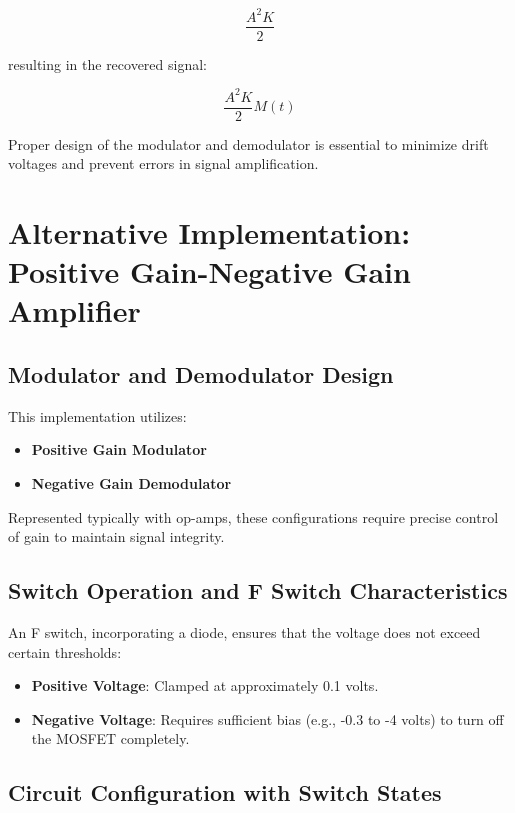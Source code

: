 \[
\frac{A^2 K}{2}
\]

resulting in the recovered signal:

\[
\frac{A^2 K}{2} M(t)
\]

Proper design of the modulator and demodulator is essential to minimize drift voltages and prevent errors in signal amplification.

\section{Alternative Implementation: Positive Gain-Negative Gain Amplifier}

\subsection{Modulator and Demodulator Design}

This implementation utilizes:
\begin{itemize}
    \item \textbf{Positive Gain Modulator}
    \item \textbf{Negative Gain Demodulator}
\end{itemize}

Represented typically with op-amps, these configurations require precise control of gain to maintain signal integrity.

\subsection{Switch Operation and F Switch Characteristics}

An F switch, incorporating a diode, ensures that the voltage does not exceed certain thresholds:
\begin{itemize}
    \item \textbf{Positive Voltage}: Clamped at approximately 0.1 volts.
    \item \textbf{Negative Voltage}: Requires sufficient bias (e.g., -0.3 to -4 volts) to turn off the MOSFET completely.
\end{itemize}

\subsection{Circuit Configuration with Switch States}

